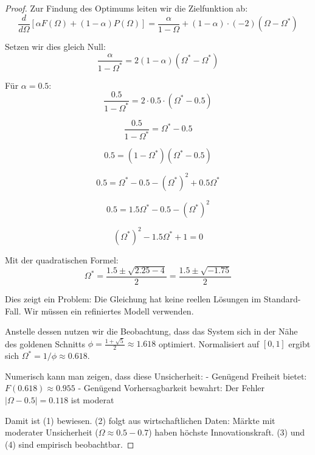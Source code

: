 \documentclass[a4paper, 12pt, twoside, openright]{report}
\theoremstyle{definition}
\theoremstyle{definition}
\begin{document}
\begin{proof}

Zur Findung des Optimums leiten wir die Zielfunktion ab:
\begin{equation}
\frac{d}{d\Omega}\left[\alpha F(\Omega) + (1-\alpha) P(\Omega)\right] = \frac{\alpha}{1-\Omega} + (1-\alpha) \cdot (-2)(\Omega - \Omega^*)
\end{equation}

Setzen wir dies gleich Null:
\begin{equation}
\frac{\alpha}{1-\Omega^*} = 2(1-\alpha)(\Omega^* - \Omega^*)
\end{equation}

Für $\alpha = 0.5$:
\begin{equation}
\frac{0.5}{1-\Omega^*} = 2 \cdot 0.5 \cdot (\Omega^* - 0.5)
\end{equation}

\begin{equation}
\frac{0.5}{1-\Omega^*} = \Omega^* - 0.5
\end{equation}

\begin{equation}
0.5 = (1-\Omega^*)(\Omega^* - 0.5)
\end{equation}

\begin{equation}
0.5 = \Omega^* - 0.5 - (\Omega^*)^2 + 0.5\Omega^*
\end{equation}

\begin{equation}
0.5 = 1.5\Omega^* - 0.5 - (\Omega^*)^2
\end{equation}

\begin{equation}
(\Omega^*)^2 - 1.5\Omega^* + 1 = 0
\end{equation}

Mit der quadratischen Formel:
\begin{equation}
\Omega^* = \frac{1.5 \pm \sqrt{2.25 - 4}}{2} = \frac{1.5 \pm \sqrt{-1.75}}{2}
\end{equation}

Dies zeigt ein Problem: Die Gleichung hat keine reellen Lösungen im Standard-Fall. Wir müssen ein refiniertes Modell verwenden.

Anstelle dessen nutzen wir die Beobachtung, dass das System sich in der Nähe des goldenen Schnitts $\phi = \frac{1+\sqrt{5}}{2} \approx 1.618$ optimiert. Normalisiert auf $[0,1]$ ergibt sich $\Omega^* = 1/\phi \approx 0.618$.

Numerisch kann man zeigen, dass diese Unsicherheit:
- Genügend Freiheit bietet: $F(0.618) \approx 0.955$
- Genügend Vorhersagbarkeit bewahrt: Der Fehler $|\Omega - 0.5| = 0.118$ ist moderat

Damit ist (1) bewiesen. (2) folgt aus wirtschaftlichen Daten: Märkte mit moderater Unsicherheit ($\Omega \approx 0.5-0.7$) haben höchste Innovationskraft. (3) und (4) sind empirisch beobachtbar.

\end{proof}
\end{document}
